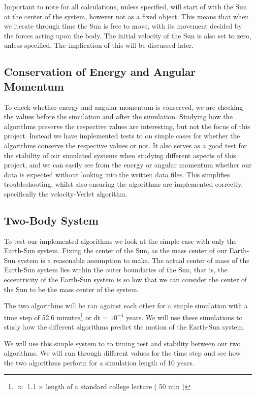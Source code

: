 \documentclass[%
reprint,
nofootinbib,
amsmath,amssymb,
aps,
]{revtex4-1}
\begin{document}
Important to note for all calculations, unless specified, will start of with the Sun at the center of the system, however not as a fixed object. This means that when we iterate through time the Sun is free to move, with its movement decided by the forces acting upon the body. The initial velocity of the Sun is also set to zero, unless specified. The implication of this will be discussed later. 
\subsection{Conservation of Energy and Angular Momentum} %
To check whether energy and angular momentum is conserved, we are checking the values before the simulation and after the simulation. Studying how the algorithms preserve the respective values are interesting, but not the focus of this project. Instead we have implemented tests to on simple cases for whether the algorithms conserve the respective values or not. 
It also serves as a good test for the stability of our simulated systems when studying different aspects of this project, and we can easily see from the energy or angular momentum whether our data is expected without looking into the written data files. This simplifies troubleshooting, whilst also ensuring the algorithms are implemented correctly, specifically the velocity-Verlet algorithm. 
\subsection{Two-Body System}%

To test our implemented algorithms we look at the simple case with only the Earth-Sun system. 
Fixing the center of the Sun, as the mass center of our Earth-Sun system is a reasonable assumption to make. The actual center of mass of the Earth-Sun system lies within the outer boundaries of the Sun, that is, the eccentricity of the Earth-Sun\cite{1994A&A...282..663S} system is so low that we can consider the center of the Sun to be the mass center of the system. 

The two algorithms will be ran against each other for a simple simulation with a time step of 52.6 minutes\footnote{$\approx$ 1.1 × length of a standard college lecture ( 50 min )} or dt = $10^{-4}$ years. We will use these simulations to study how the different algorithms predict the motion of the Earth-Sun system.
 
We will use this simple system to to timing test and stability between our two algorithms. We will run through different values for the time step and see how the two algorithms perform for a simulation length of 10 years. 
\end{document}
